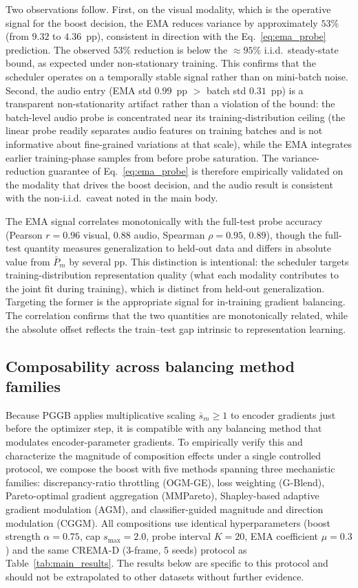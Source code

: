 \documentclass{article} %
\begin{document}
Two observations follow. First, on the visual modality, which is the operative signal for the boost decision, the EMA reduces variance by approximately $53\%$ (from $9.32$ to $4.36$~pp), consistent in direction with the Eq.~\ref{eq:ema_probe} prediction. The observed $53\%$ reduction is below the $\approx 95\%$ i.i.d.\ steady-state bound, as expected under non-stationary training. This confirms that the scheduler operates on a temporally stable signal rather than on mini-batch noise. Second, the audio entry (EMA std $0.99$~pp $>$ batch std $0.31$~pp) is a transparent non-stationarity artifact rather than a violation of the bound: the batch-level audio probe is concentrated near its training-distribution ceiling (the linear probe readily separates audio features on training batches and is not informative about fine-grained variations at that scale), while the EMA integrates earlier training-phase samples from before probe saturation. The variance-reduction guarantee of Eq.~\ref{eq:ema_probe} is therefore empirically validated on the modality that drives the boost decision, and the audio result is consistent with the non-i.i.d.\ caveat noted in the main body.

The EMA signal correlates monotonically with the full-test probe accuracy (Pearson $r=0.96$ visual, $0.88$ audio, Spearman $\rho=0.95$, $0.89$), though the full-test quantity measures generalization to held-out data and differs in absolute value from $\bar{P}_m$ by several pp. This distinction is intentional: the scheduler targets training-distribution representation quality (what each modality contributes to the joint fit during training), which is distinct from held-out generalization. Targeting the former is the appropriate signal for in-training gradient balancing. The correlation confirms that the two quantities are monotonically related, while the absolute offset reflects the train--test gap intrinsic to representation learning.

\subsection{Composability across balancing method families}
\label{app:composability}

Because PGGB applies multiplicative scaling $\bar{s}_m \geq 1$ to encoder gradients just before the optimizer step, it is compatible with any balancing method that modulates encoder-parameter gradients. To empirically verify this and characterize the magnitude of composition effects under a single controlled protocol, we compose the boost with five methods spanning three mechanistic families: discrepancy-ratio throttling (OGM-GE), loss weighting (G-Blend), Pareto-optimal gradient aggregation (MMPareto), Shapley-based adaptive gradient modulation (AGM), and classifier-guided magnitude and direction modulation (CGGM). All compositions use identical hyperparameters (boost strength $\alpha=0.75$, cap $s_{\max}=2.0$, probe interval $K=20$, EMA coefficient $\mu=0.3$) and the same CREMA-D (3-frame, 5 seeds) protocol as Table~\ref{tab:main_results}. The results below are specific to this protocol and should not be extrapolated to other datasets without further evidence.
\end{document}

